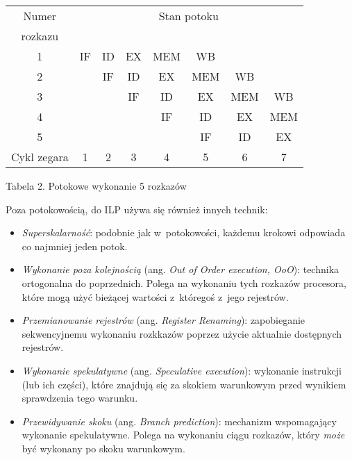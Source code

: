 	\begin{center}
	\begin{tabular}{|c|c|c|c|c|c|c|c|} \hline
	Numer 		 & \multicolumn{7}{c|}{Stan potoku} \\
	rozkazu & \multicolumn{7}{c|}{} \\ \hline
	1 & IF & ID & EX & \cellcolor{yellow} MEM & WB & & \\ \hline
	2 & & IF & ID & \cellcolor{yellow} EX & MEM & WB & \\ \hline
	3 & & & IF & \cellcolor{yellow} ID & EX & MEM & WB \\ \hline
	4 & & & & \cellcolor{yellow} IF & ID & EX & MEM \\ \hline
	5 & & & & \cellcolor{yellow} & IF & ID & EX \\ \hline \hline
	Cykl zegara & 1 & 2 & 3 & \cellcolor{yellow} 4 & 5 & 6 & 7 \\ \hline
	\end{tabular}\par
	\begin{small} Tabela 2. Potokowe wykonanie 5 rozkazów \end{small}
	\end{center}
\par
%
\indent
	Poza potokowością, do ILP używa się również innych technik:
	\begin{itemize}
	\item \emph{Superskalarność}: podobnie jak w~potokowości, każdemu krokowi odpowiada co najmniej jeden potok.
	\item \emph{Wykonanie poza kolejnością} (ang. \emph{Out of Order execution, OoO}): technika ortogonalna do poprzednich. Polega na 
		wykonaniu tych rozkazów procesora, które mogą użyć bieżącej wartości z~któregoś z~jego rejestrów.
	\item \emph{Przemianowanie rejestrów} (ang. \emph{Register Renaming}): zapobieganie sekwencyjnemu wykonaniu rozkkazów poprzez użycie 
		aktualnie dostępnych rejestrów.
	\item \emph{Wykonanie spekulatywne} (ang. \emph{Speculative execution}): wykonanie instrukcji (lub ich części), które znajdują się
		za skokiem warunkowym przed wynikiem sprawdzenia tego warunku.
	\item \emph{Przewidywanie skoku} (ang. \emph{Branch prediction}): mechanizm wspomagający wykonanie spekulatywne. Polega na wykonaniu
	 ciągu rozkazów, który \emph{może} być wykonany po skoku warunkowym.
	\end{itemize}
